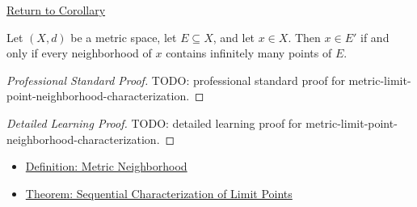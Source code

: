 \newpage
{}
\label{prf:metric-limit-point-neighborhood-characterization}

\begin{remark*}[Return]
\hyperref[cor:metric-limit-point-neighborhood-characterization]{Return to Corollary}
\end{remark*}

\begin{corollary*}
Let \((X,d)\) be a metric space, let \(E\subseteq X\), and let \(x\in X\).
Then \(x\in E'\) if and only if every neighborhood of \(x\) contains
infinitely many points of \(E\).
\end{corollary*}

\begin{proof}[Professional Standard Proof]
\LRAProofBodyStart
TODO: professional standard proof for metric-limit-point-neighborhood-characterization.
\end{proof}

\begin{proof}[Detailed Learning Proof]
\LRAProofBodyStart
TODO: detailed learning proof for metric-limit-point-neighborhood-characterization.
\end{proof}

\begin{remark*}
\end{remark*}

\begin{dependencies}
\begin{itemize}
  \item \hyperref[def:metric-neighborhood]{Definition: Metric Neighborhood}
  \item \hyperref[thm:metric-limit-point-sequential-characterization]{Theorem: Sequential Characterization of Limit Points}
\end{itemize}
\end{dependencies}

\clearpage
